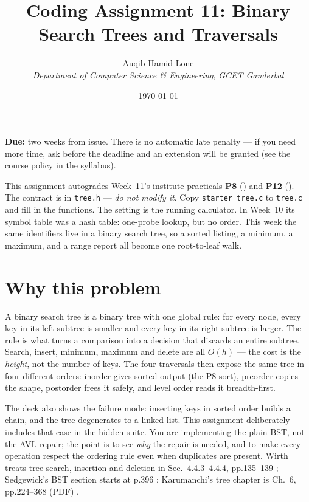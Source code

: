 \documentclass[11pt]{article}
\title{Coding Assignment 11: Binary Search Trees and Traversals}
\author{Auqib Hamid Lone\\[0.3em]
  \emph{Department of Computer Science \& Engineering}, \emph{GCET Ganderbal}}
\date{\today}
\begin{document}
\maketitle

\noindent\textbf{Due:} two weeks from issue. There is no automatic late penalty --- if you need more time, ask before the deadline and an extension will be granted (see the course policy in the syllabus).

\noindent This assignment autogrades Week~11's institute practicals \textbf{P8} () and \textbf{P12} (). The contract is in \texttt{tree.h} --- \emph{do not modify it}. Copy \texttt{starter\_tree.c} to \texttt{tree.c} and fill in the functions. The setting is the running calculator. In Week~10 its symbol table was a hash table: one-probe lookup, but no order. This week the same identifiers live in a binary search tree, so a sorted listing, a minimum, a maximum, and a range report all become one root-to-leaf walk.

\section{Why this problem}

A binary search tree is a binary tree with one global rule: for every node, every key in its left subtree is smaller and every key in its right subtree is larger. The rule is what turns a comparison into a decision that discards an entire subtree. Search, insert, minimum, maximum and delete are all $O(h)$ --- the cost is the \emph{height}, not the number of keys. The four traversals then expose the same tree in four different orders: inorder gives sorted output (the P8 sort), preorder copies the shape, postorder frees it safely, and level order reads it breadth-first.

The deck also shows the failure mode: inserting keys in sorted order builds a chain, and the tree degenerates to a linked list. This assignment deliberately includes that case in the hidden suite. You are implementing the plain BST, not the AVL repair; the point is to see \emph{why} the repair is needed, and to make every operation respect the ordering rule even when duplicates are present. Wirth treats tree search, insertion and deletion in Sec.~4.4.3--4.4.4, pp.135--139 \cite{Wirth2004_algorithms_data_structures}; Sedgewick's BST section starts at p.396 \cite{Sedgewick2011_algorithms}; Karumanchi's tree chapter is Ch.~6, pp.224--368 (PDF) \cite{Karumanchi2017_data_structures_algorithms_made_easy}.
\end{document}

